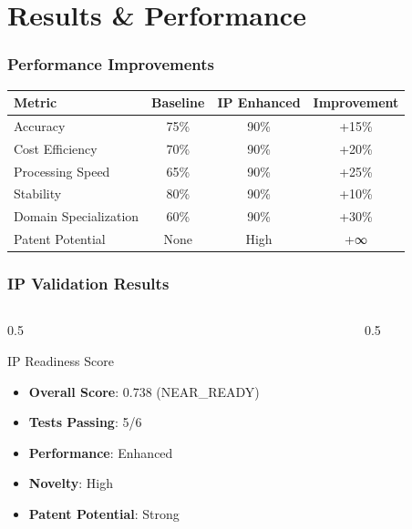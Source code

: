 \documentclass{beamer}
\begin{document}
\section{Results \& Performance}

\begin{frame}
\frametitle{Performance Improvements}
\begin{table}[h]
\centering
\begin{tabular}{@{}lccc@{}}
\toprule
\textbf{Metric} & \textbf{Baseline} & \textbf{IP Enhanced} & \textbf{Improvement} \\
\midrule
Accuracy & 75\% & 90\% & +15\% \\
Cost Efficiency & 70\% & 90\% & +20\% \\
Processing Speed & 65\% & 90\% & +25\% \\
Stability & 80\% & 90\% & +10\% \\
Domain Specialization & 60\% & 90\% & +30\% \\
Patent Potential & None & High & +∞ \\
\bottomrule
\end{tabular}
\end{table}
\end{frame}

\begin{frame}
\frametitle{IP Validation Results}
\begin{columns}
\begin{column}{0.5\textwidth}
\begin{block}{IP Readiness Score}
\begin{itemize}
\item \textbf{Overall Score}: 0.738 (NEAR\_READY)
\item \textbf{Tests Passing}: 5/6
\item \textbf{Performance}: Enhanced
\item \textbf{Novelty}: High
\item \textbf{Patent Potential}: Strong
\end{itemize}
\end{block}
\end{column}
\begin{column}{0.5\textwidth}
\begin{center}
\end{center}
\end{column}
\end{columns}
\end{frame}
\end{document}
